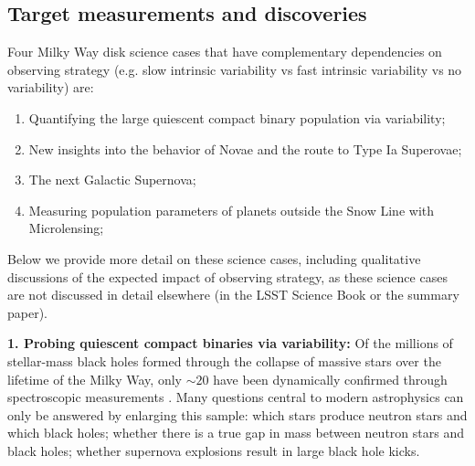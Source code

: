 
\subsection{Target measurements and discoveries}
\label{sec:\secname:MW_Disk_targets}



Four Milky Way disk science cases that have complementary dependencies on
observing strategy (e.g. slow intrinsic variability vs fast intrinsic
variability vs no variability) are:

\begin{enumerate}
  \item Quantifying the large quiescent compact binary population via variability;
  \item New insights into the behavior of Novae and the route to Type Ia Superovae;
  \item The next Galactic Supernova;
  \item Measuring population parameters of planets outside the Snow Line with Microlensing;
\end{enumerate}

Below we provide more detail on these science cases, including
qualitative discussions of the expected impact of observing
strategy, as these science cases are not discussed in detail elsewhere
(in the LSST Science Book or the \citet{IvezicEtal2008} summary paper).


{\bf 1. Probing quiescent compact binaries via variability:} Of the
millions of stellar-mass black holes formed through the collapse of
massive stars over the lifetime of the Milky Way, only $\sim 20$ have
been dynamically confirmed through spectroscopic measurements
\citep[e.g.,][]{2015arXiv151008869C}.  Many questions central to modern
astrophysics can only be answered by enlarging this sample: which
stars produce neutron stars and which black holes; whether there is a
true gap in mass between neutron stars and black holes; whether
supernova explosions result in large black hole kicks.

